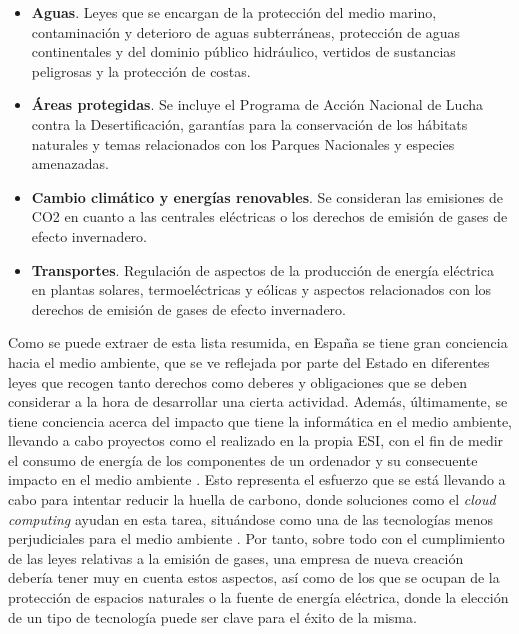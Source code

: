 \begin{itemize}
    \item \textbf{Aguas}. Leyes que se encargan de la protección del medio marino, contaminación y deterioro de aguas subterráneas, protección de aguas continentales y del dominio público hidráulico, vertidos de sustancias peligrosas y la protección de costas.
    
    \item \textbf{Áreas protegidas}. Se incluye el Programa de Acción Nacional de Lucha contra la Desertificación, garantías para la conservación de los hábitats naturales y temas relacionados con los Parques Nacionales y especies amenazadas.
    
    \clearpage
    
    \item \textbf{Cambio climático y energías renovables}. Se consideran las emisiones de CO2 en cuanto a las centrales eléctricas o los derechos de emisión de gases de efecto invernadero.
    
    \item \textbf{Transportes}. Regulación de aspectos de la producción de energía eléctrica en plantas solares, termoeléctricas y eólicas y aspectos relacionados con los derechos de emisión de gases de efecto invernadero.
\end{itemize}

Como se puede extraer de esta lista resumida, en España se tiene gran conciencia hacia el medio ambiente, que se ve reflejada por parte del Estado en diferentes leyes que recogen tanto derechos como deberes y obligaciones que se deben considerar a la hora de desarrollar una cierta actividad. Además, últimamente, se tiene conciencia acerca del impacto que tiene la informática en el medio ambiente, llevando a cabo proyectos como el realizado en la propia \acf{ESI}, con el fin de medir el consumo de energía de los componentes de un ordenador y su consecuente impacto en el medio ambiente \cite{auroragalisteo2019}. Esto representa el esfuerzo que se está llevando a cabo para intentar reducir la huella de carbono, donde soluciones como el \textit{cloud computing} ayudan en esta tarea, situándose como una de las tecnologías menos perjudiciales para el medio ambiente \cite{keyandcloud2018}. Por tanto, sobre todo con el cumplimiento de las leyes relativas a la emisión de gases, una empresa de nueva creación debería tener muy en cuenta estos aspectos, así como de los que se ocupan de la protección de espacios naturales o la fuente de energía eléctrica, donde la elección de un tipo de tecnología puede ser clave para el éxito de la misma.

